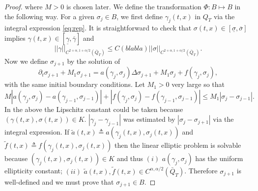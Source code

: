 \documentclass[a4paper,11pt]{article}
\def\blue{\color{blue}}
\theoremstyle{remark}
\begin{document}
\begin{proof}
where $M>0$ is chosen later. We define the transformation $\Phi: B \mapsto B$ in the following way. For a given $\sigma_j \in B$, we first define $\gamma_j(t,x)$ in $Q_T$ via the integral expression \eqref{eq:rep}.  
It is straightforward to check that $\sigma(t,x)\in [\underline\sigma,\overline\sigma]$ implies $\gamma(t,x) \in [\underline\gamma,\overline\gamma]$ and 
{\blue$$||\gamma||_{C^{2+\alpha,1+\alpha/2}(\bar{Q}_T)} \le C(blabla)||\sigma||_{C^{2+\alpha,1+\alpha/2}(\bar{Q}_T)}.$$}
Now we define $\sigma_{j+1}$ by the solution of 
\begin{equation}
\partial_t \sigma_{j+1} + M_1\sigma_{j+1} = a(\gamma_j,\sigma_j)\Delta \sigma_{j+1} + M_1\sigma_j + f(\gamma_j,\sigma_j), \label{eq:iteration}
\end{equation}
with the same initial boundary conditions. Let $M_1>0$ very large so that 
$$ M|a(\gamma_j,\sigma_j)-a(\gamma_{j-1},\sigma_{j-1})|+ |f(\gamma_j,\sigma_j)-f(\gamma_{j-1},\sigma_{j-1})| \le M_1|\sigma_j - \sigma_{j-1}|.$$
In the above the Lipschitz constant could be taken because $(\gamma(t,x),\sigma(t,x))\in K$. $|\gamma_j - \gamma_{j-1}|$ was estimated by $|\sigma_j-\sigma_{j+1}|$ via the integral expression. If $\tilde a(t,x)\triangleq a(\gamma_j(t,x),\sigma_j(t,x))$ and $\tilde f(t,x)\triangleq f(\gamma_j(t,x),\sigma_j(t,x))$ then the linear elliptic problem is solvable because $(\gamma_j(t,x),\sigma_j(t,x))\in K$ and thus $(i)$ $a(\gamma_j,\sigma_j)$ has the uniform ellipticity constant; $(ii)$ $\tilde a(t,x),\tilde f(t,x) \in C^{\alpha,\alpha/2}(\bar{Q}_T)$. Therefore $\sigma_{j+1}$ is well-defined and we must prove that $\sigma_{j+1} \in B$.%


\end{proof}
\end{document}
